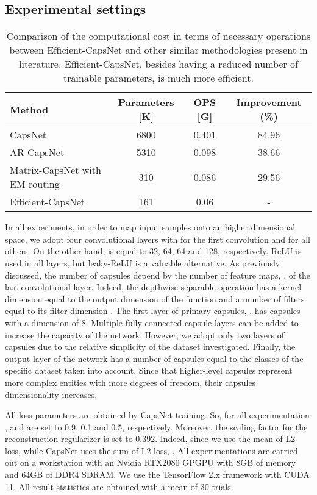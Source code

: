 \documentclass{article}
\begin{document}
\subsection{Experimental settings}
\begin{table}[b]
\centering
\begin{tabular}{lccc}
\toprule
Method                         & Parameters {[}K{]} & OPS {[}G{]} & Improvement (\%) \\ \hline
CapsNet\cite{sabour2017dynamic}        & 6800 &        0.401        & 84.96     \\
AR CapsNet\cite{choi2019attention}     & 5310 &        0.098        & 38.66   \\ 
Matrix-CapsNet with EM routing\cite{hinton2018matrix} & 310  & 0.086               & 29.56                   \\ 
Efficient-CapsNet      & 161 &         0.06                & -                       \\ \bottomrule
\end{tabular}
\caption{Comparison of the computational cost in terms of necessary operations between Efficient-CapsNet and other similar methodologies present in literature. Efficient-CapsNet, besides having a reduced number of trainable parameters, is much more efficient.}
\label{table:computation_cost}
\end{table}
In all experiments, in order to map input samples onto an higher dimensional space, we adopt four convolutional layers with  for the first convolution and  for all others. On the other hand,  is equal to 32, 64, 64 and 128, respectively. ReLU is used in all layers, but leaky-ReLU is a valuable alternative. As previously discussed, the number of capsules depend by the number of feature maps, , of the last convolutional layer. Indeed, the depthwise separable operation has a kernel dimension  equal to the output dimension  of the  function and a number of filters  equal to its filter dimension . The first layer of primary capsules, , has  capsules with a dimension  of 8.
Multiple fully-connected capsule layers can be added to increase the capacity of the network. However, we adopt only two layers of capsules due to the relative simplicity of the dataset investigated. Finally, the output layer of the network has a number of capsules  equal to the classes of the specific dataset taken into account. Since that higher-level capsules represent more complex entities with more degrees of freedom, their capsules dimensionality increases. 

All loss parameters are obtained by CapsNet\cite{sabour2017dynamic} training. So, for all experimentation ,  and  are set to 0.9, 0.1 and 0.5, respectively. Moreover, the scaling factor  for the reconstruction regularizer is set to 0.392. Indeed, since we use the mean of L2 loss, while CapsNet uses the sum of L2 loss, . All experimentations are carried out on a workstation with an Nvidia RTX2080 GPGPU with 8GB of memory and 64GB of DDR4 SDRAM. We use the TensorFlow 2.x framework with CUDA 11. All result statistics are obtained with a mean of 30 trials.
 
\end{document}
